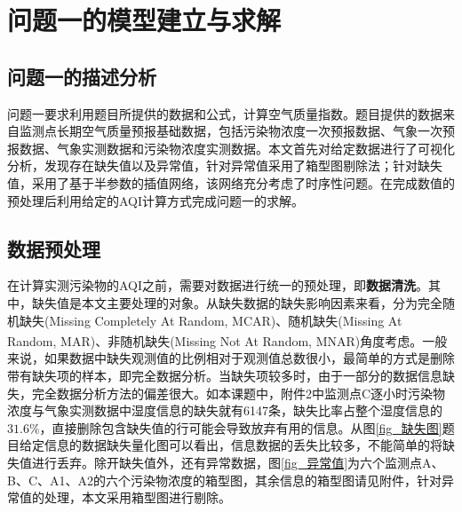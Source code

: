 \documentclass[a4paper,10pt]{my_paper}
\numberwithin{equation}{section}
\begin{document}

\section{问题一的模型建立与求解}
\subsection{问题一的描述分析}
问题一要求利用题目所提供的数据和公式，计算空气质量指数。题目提供的数据来自监测点长期空气质量预报基础数据，包括污染物浓度一次预报数据、气象一次预报数据、气象实测数据和污染物浓度实测数据。本文首先对给定数据进行了可视化分析，发现存在缺失值以及异常值，针对异常值采用了箱型图剔除法；针对缺失值，采用了基于半参数的插值网络，该网络充分考虑了时序性问题。在完成数值的预处理后利用给定的AQI计算方式完成问题一的求解。

\subsection{数据预处理}
在计算实测污染物的AQI之前，需要对数据进行统一的预处理，即\textbf{数据清洗}。其中，缺失值是本文主要处理的对象。从缺失数据的缺失影响因素来看，分为完全随机缺失(Missing Completely At Random, MCAR)、随机缺失(Missing At Random, MAR)、非随机缺失(Missing Not At Random, MNAR)角度考虑\textsuperscript{\cite{ref2}}。一般来说，如果数据中缺失观测值的比例相对于观测值总数很小，最简单的方式是删除带有缺失项的样本，即完全数据分析。当缺失项较多时，由于一部分的数据信息缺失，完全数据分析方法的偏差很大。如本课题中，附件2中监测点C逐小时污染物浓度与气象实测数据中湿度信息的缺失就有6147条，缺失比率占整个湿度信息的${31.6\%}$，直接删除包含缺失值的行可能会导致放弃有用的信息。从图\ref{fig_缺失图}题目给定信息的数据缺失量化图可以看出，信息数据的丢失比较多，不能简单的将缺失值进行丢弃。除开缺失值外，还有异常数据，图\ref{fig_异常值}为六个监测点A、B、C、A1、A2的六个污染物浓度的箱型图，其余信息的箱型图请见附件，针对异常值的处理，本文采用箱型图进行剔除。
\end{document}
